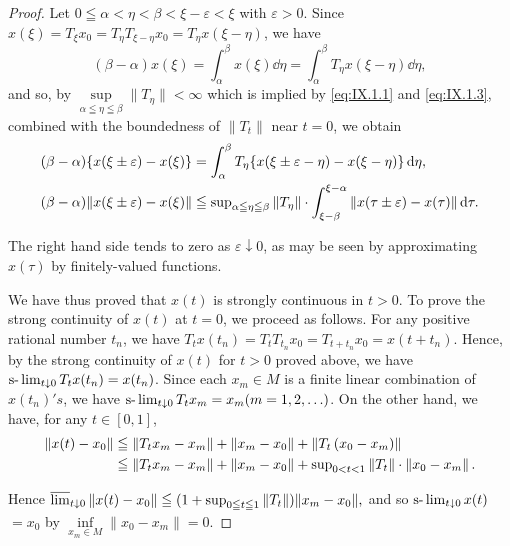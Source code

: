 \begin{proof}
Let $0 \leqq \alpha < \eta < \beta < \xi - \varepsilon < \xi$ with $\varepsilon > 0$. Since $x(\xi) = T_{\xi}x_0 = T_{\eta}T_{\xi - \eta}x_0 = T_{\eta}x(\xi - \eta)$, we have 
\[
(\beta - \alpha) x (\xi) = \int_{\alpha} ^{\beta} x (\xi) \dd \eta = \int_{\alpha} ^{\beta} T _{\eta} x (\xi - \eta) \dd \eta ,
\]
and so, by $\sup\limits_{\alpha \leqq \eta \leqq \beta}\|T_{\eta}\| < \infty$ which is implied by \eqref{eq:IX.1.1} and \eqref{eq:IX.1.3}, combined with the boundedness of $\|T_t\|$ near $t = 0$, we obtain 
\begin{align}
(\beta - \alpha) \{x (\xi \pm \varepsilon) - x (\xi) \}& = \int_{\alpha} ^{\beta} T _{\eta} \{x (\xi \pm \varepsilon - \eta) - x (\xi - \eta) \} \dd \eta , \notag \\
(\beta - \alpha) \| x (\xi \pm \varepsilon) - x (\xi) \|& \leqq \sup\limits _{\alpha \leqq \eta \leqq \beta} \| T _{\eta} \| \cdot \int_{\xi - \beta} ^{\xi - \alpha} \| x (\tau \pm \varepsilon) - x (\tau) \| \dd \tau . \notag
\end{align}

The right hand side tends to zero as $\varepsilon \downarrow 0$, as may be seen by approximating $x(\tau)$ by finitely-valued functions. 

We have thus proved that $x(t)$ is strongly continuous in $t > 0$. To prove the strong continuity of $x(t)$ at $t = 0$, we proceed as follows. For any positive rational number $t_n$, we have $T_t x(t_n) = T_t T_{t_{n}} x_0 = T_{t+t_n} x_0 = x(t + t_n)$. Hence, by the strong continuity of $x(t)$ for $t > 0$ proved above, we have $\slim\limits_{t \downarrow 0} T_t x(t_n) = x(t_n)$. Since each $x_m \in M$ is a finite linear combination of $x(t_n)'s$, we have $\slim\limits_{t \downarrow 0} T_t x_m = x_m (m = 1, 2, \ldots)$. On the other hand, we have, for any $t \in [0, 1]$, 
\begin{align}
\left\| x (t) - x _{0} \right\|& \leqq \left\| T _{t} x _{m} - x _{m} \right\| + \left\| x _{m} - x _{0} \right\| + \left\| T _{t} \left(x _{0} - x _{m}\right) \right\| \notag \\
&\leqq \left\| T _{t} x _{m} - x _{m} \right\| + \left\| x _{m} - x _{0} \right\| + \sup\limits _{0<t<1} \left\| T _{t} \right\| \cdot \left\| x _{0} - x _{m} \right\|. \notag
\end{align}

Hence $\varlimsup\limits_{t\downarrow 0}\|x(t) - x_0\|\leqq (1 + \sup\limits_{0\leqq t\leqq 1}\|T_t\|)\|x_m - x_0\|,$ and so $\slim\limits_{t\downarrow 0}x(t)$ $= x_0$ by $\inf\limits_{x_m\in M}\|x_0 - x_m\| = 0.$ 
\end{proof}


